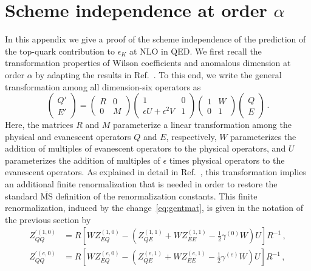 \documentclass[letter,11pt,DIV=12,abstract=true,numbers=noenddot,titlepage=false,twocolumn=false,draft=false]{scrartcl}
\begin{document}
\section{Scheme independence at order $\alpha$}\label{sec:scheme}

In this appendix we give a proof of the scheme independence of the
prediction of the top-quark contribution to $\epsilon_K$ at NLO in
QED. We first recall the transformation properties of Wilson
coefficients and anomalous dimension at order $\alpha$ by adapting the
results in Ref.~\cite{Brod:2010mj}. To this end, we write the general
transformation among all dimension-six operators as
\begin{equation}\label{eq:gentmat}
\begin{pmatrix}
Q'\\
E'
\end{pmatrix}
=
\begin{pmatrix}
R&0\\
0&M
\end{pmatrix}
\begin{pmatrix}
1&0\\
\epsilon U + \epsilon^2 V&1
\end{pmatrix}
\begin{pmatrix}
1&W\\
0&1
\end{pmatrix}
\begin{pmatrix}
Q\\
E
\end{pmatrix}\,.
\end{equation}
Here, the matrices $R$ and $M$ parameterize a linear transformation
among the physical and evanescent operators $Q$ and $E$, respectively,
$W$ parameterizes the addition of multiples of evanescent operators to
the physical operators, and $U$ parameterizes the addition of
multiples of $\epsilon$ times physical operators to the evanescent
operators. As explained in detail in Ref.~\cite{Gorbahn:2004my}, this
transformation implies an additional finite renormalization that is
needed in order to restore the standard $\overline{\text{MS}}$
definition of the renormalization constants. This finite
renormalization, induced by the change~\eqref{eq:gentmat}, is given in
the notation of the previous section by
\begin{align}\label{eq:finz}
  Z_{QQ}^{\prime(1,0)} &= R \left[ W Z_{EQ}^{(1,0)} - \left( Z_{QE}^{(1,1)} +
      W Z_{EE}^{(1,1)} - \frac{1}{2} \gamma^{(0)} W \right) U \right]
  R^{-1}\,, \\ 
  Z_{QQ}^{\prime(e,0)} &= R \left[ W Z_{EQ}^{(e,0)} - \left( Z_{QE}^{(e,1)} +
      W Z_{EE}^{(e,1)} - \frac{1}{2} \gamma^{(e)} W \right) U \right]
  R^{-1}\,,
\end{align}
\end{document}
